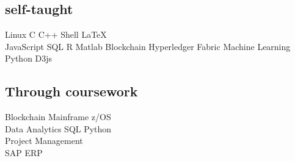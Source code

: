 \documentclass[]{deedy-resume-openfont}
\def\tb{\textbullet}
\begin{document}
\begin{minipage}[t]{0.33\textwidth}
\subsection{self-taught}
 Linux \tb{}
C \tb{} C++ \tb{} Shell \tb{} \LaTeX\ \\
  JavaScript \tb{} SQL \tb{} R \tb{} Matlab \tb{}
Blockchain \tb{} Hyperledger Fabric \tb{} Machine Learning \tb{} Python \tb{}
 D3js \\ 
\sectionsep

\subsection{Through coursework}
Blockchain \tb{} Mainframe \tb{} z/OS \\
Data Analytics \tb{} SQL \tb{} Python \\
Project Management \\
SAP ERP

%
%

\end{minipage} 
\hfill
\end{document}
